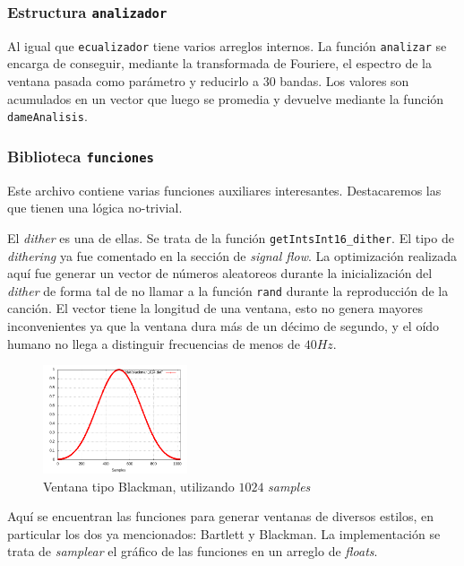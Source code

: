 \documentclass[%
    compressed,
    titlepage,
    narroweqnarray,
    inline,
    twoside,
    ]{ieee}
\begin{document}
\subsubsection{Estructura \texttt{analizador}}
Al igual que \texttt{ecualizador} tiene varios arreglos internos.
La funci\'on \texttt{analizar} se encarga de conseguir, mediante la transformada de Fouriere, el espectro de la ventana pasada como par\'ametro y reducirlo a $30$ bandas.
Los valores son acumulados en un vector que luego se promedia y devuelve mediante la funci\'on \texttt{dameAnalisis}.

\subsubsection{Biblioteca \texttt{funciones}}
Este archivo contiene varias funciones auxiliares interesantes.
Destacaremos las que tienen una l\'ogica no-trivial.

El \textit{dither} es una de ellas. Se trata de la funci\'on \texttt{getIntsInt16\_dither}. El tipo de \textit{dithering} ya fue comentado en la secci\'on
de \textit{signal flow}. La optimizaci\'on realizada aqu\'i fue generar un vector de n\'umeros aleatoreos durante la inicializaci\'on del \textit{dither}
de forma tal de no llamar a la funci\'on \texttt{rand} durante la reproducci\'on de la canci\'on. El vector tiene la longitud de una ventana, esto no genera
mayores inconvenientes ya que la ventana dura m\'as de un d\'ecimo de segundo, y el o\'ido humano no llega a distinguir frecuencias de menos de $40Hz$.

\begin{figure}
    \begin{center}
        \includegraphics[width=0.38\textwidth]{img/blackman1024.png}
    \end{center}
    \caption{Ventana tipo Blackman, utilizando $1024$ \textit{samples}}
\end{figure}

Aqu\'i se encuentran las funciones para generar ventanas de diversos estilos, en particular los dos ya mencionados: Bartlett y Blackman. La implementaci\'on
se trata de \textit{samplear} el gr\'afico de las funciones en un arreglo de \textit{floats}.
\end{document}
